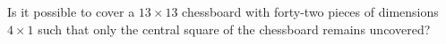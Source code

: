 Is it possible to cover a $13\times 13$ chessboard with forty-two pieces of dimensions $4\times 1$ such that only the central square of the chessboard remains uncovered?